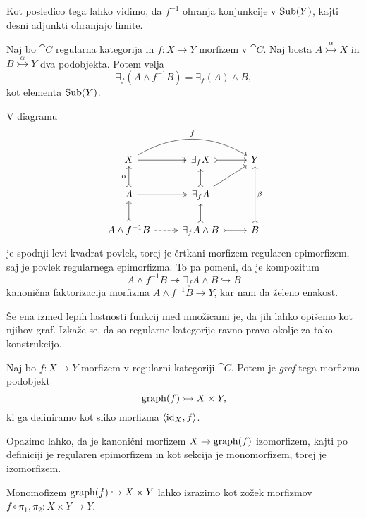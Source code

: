 \documentclass[../kategoricna_logika.tex]{subfiles}
\begin{document}
\noindent
Kot posledico tega lahko vidimo, da $f^{-1}$ ohranja konjunkcije v
$\operatorname{Sub}(Y)$, kajti desni adjunkti ohranjajo limite.
\begin{lema}\label{lema:frobeniusova-lema}
  Naj bo $\cat{C}$ regularna kategorija in ${f : X \to Y}$ morfizem v
  $\cat{C}$.  Naj bosta $A \overset{\alpha}{\rightarrowtail} X$ in
  $B \overset{\alpha}{\rightarrowtail} Y$ dva podobjekta.  Potem velja
  $$\exists_f(A \wedge f^{-1}B) = \exists_f(A) \wedge B,$$
  kot elementa $\operatorname{Sub}(Y)$.
\end{lema}
\begin{dokaz}
  V diagramu
  \begin{equation*}
    \begin{tikzcd}
      X \ar[rr, bend left, "f"] \ar[r, two heads] & \exists_f X \ar[r, tail] & Y \\
      A \ar[u, tail, "\alpha"] \ar[r, two heads] & \exists_f A \ar[u, tail] \ar[ur] & \\
      A \land f^{-1}B \ar[u, tail] \ar[r, dashed, two heads] &
      \exists_f A \land B \ar[r, tail] \ar[u, tail] & B \ar[uu, tail,
      "\beta"']
    \end{tikzcd}
  \end{equation*}
  je spodnji levi kvadrat povlek, torej je črtkani morfizem regularen
  epimorfizem, saj je povlek regularnega epimorfizma.  To pa pomeni,
  da je kompozitum
  \[A \land f^{-1}B \twoheadrightarrow \exists_f A \land B \hookrightarrow B\]
  kanonična faktorizacija morfizma
  $A \land f^{-1}B \to Y$, kar nam da želeno enakost.
\end{dokaz}
Še ena izmed lepih lastnosti funkcij med množicami je, da jih lahko
opišemo kot njihov graf.  Izkaže se, da so regularne kategorije ravno
pravo okolje za tako konstrukcijo.
\begin{definicija}\label{definicija:graf-morfizma}
  Naj bo $f : X \to Y$ morfizem v regularni kategoriji
  $\cat{C}$. Potem je \emph{graf} tega morfizma podobjekt
  $$\operatorname{graph}(f) \rightarrowtail X \times Y,$$
  ki ga definiramo kot sliko morfizma $\langle \mathrm{id}_X, f \rangle$.
\end{definicija}
Opazimo lahko, da je kanonični morfizem $X \to \operatorname{graph}(f)$ izomorfizem,
kajti po definiciji je regularen epimorfizem in kot sekcija je
monomorfizem, torej je izomorfizem.
\begin{lema}\label{lema:graf-kot-zozek}
  Monomofizem $\operatorname{graph}(f) \hookrightarrow X \times Y$ lahko izrazimo
  kot zožek morfizmov $f\circ \pi_1, \pi_2 : X \times Y \to Y$.
\end{lema}
\end{document}
